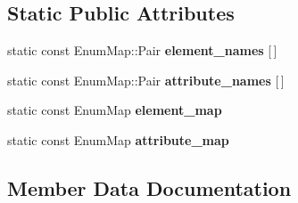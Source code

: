 \subsection*{Static Public Attributes}
\begin{DoxyCompactItemize}
\item 
static const Enum\+Map\+::\+Pair {\bfseries element\+\_\+names} \mbox{[}$\,$\mbox{]}
\item 
static const Enum\+Map\+::\+Pair {\bfseries attribute\+\_\+names} \mbox{[}$\,$\mbox{]}\hypertarget{structMeshXML_ac903c202df9e1ea0e94724e1f47cd738}{}\label{structMeshXML_ac903c202df9e1ea0e94724e1f47cd738}

\item 
static const Enum\+Map {\bfseries element\+\_\+map}\hypertarget{structMeshXML_a31e23219fd1cc29a691d7587c0dd74bc}{}\label{structMeshXML_a31e23219fd1cc29a691d7587c0dd74bc}

\item 
static const Enum\+Map {\bfseries attribute\+\_\+map}\hypertarget{structMeshXML_a736009b0693b15d7c94bddb2256d4e4e}{}\label{structMeshXML_a736009b0693b15d7c94bddb2256d4e4e}

\end{DoxyCompactItemize}


\subsection{Member Data Documentation}
